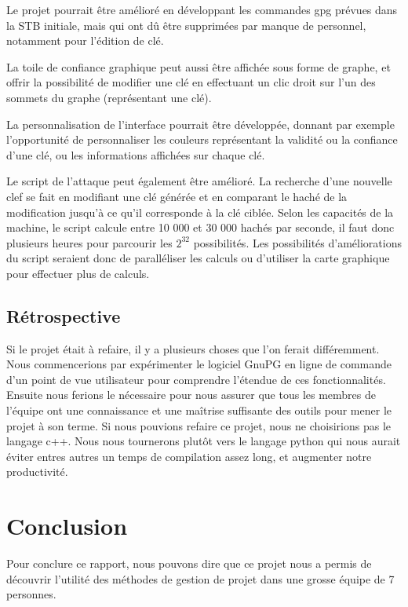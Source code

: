 \documentclass{../res/univ-projet}
\begin{document}
    Le projet pourrait être amélioré en développant les commandes gpg prévues dans la STB initiale, mais qui ont dû être supprimées par manque de personnel, notamment pour l'édition de clé. 
    
    La toile de confiance graphique peut aussi être affichée sous forme de graphe, et offrir la possibilité de modifier une clé en effectuant un clic droit sur l'un des sommets du graphe (représentant une clé). 
    
    La personnalisation de l'interface pourrait être développée, donnant par exemple l'opportunité de personnaliser les couleurs représentant la validité ou la confiance d'une clé, ou les informations affichées sur chaque clé. 
    
    Le script de l'attaque peut également être amélioré. La recherche d'une nouvelle clef se fait en modifiant une clé générée et en comparant le haché de la modification jusqu'à ce qu'il corresponde à la clé ciblée. Selon les capacités de la machine, le script calcule entre 10 000 et 30 000 hachés par seconde, il faut donc plusieurs heures pour parcourir les $2^{32}$ possibilités. Les possibilités d'améliorations du script seraient donc de paralléliser les calculs ou d'utiliser la carte graphique pour effectuer plus de calculs.

  \subsection{Rétrospective}
	Si le projet était à refaire, il y a plusieurs choses que l'on ferait différemment. Nous commencerions par expérimenter le logiciel GnuPG en ligne de commande d'un point de vue utilisateur pour comprendre l'étendue de ces fonctionnalités. Ensuite nous ferions le nécessaire pour nous assurer que tous les membres de l'équipe ont une connaissance et une maîtrise suffisante des outils pour mener le projet à son terme.
	Si nous pouvions refaire ce projet, nous ne choisirions pas le langage c++. Nous nous tournerons plutôt vers le langage python qui nous aurait éviter entres autres un temps de compilation assez long, et augmenter notre productivité.

\section{Conclusion}

	Pour conclure ce rapport, nous pouvons dire que ce projet nous a permis de découvrir l'utilité des méthodes de gestion de projet dans une grosse équipe de 7 personnes. 
	
\end{document}
